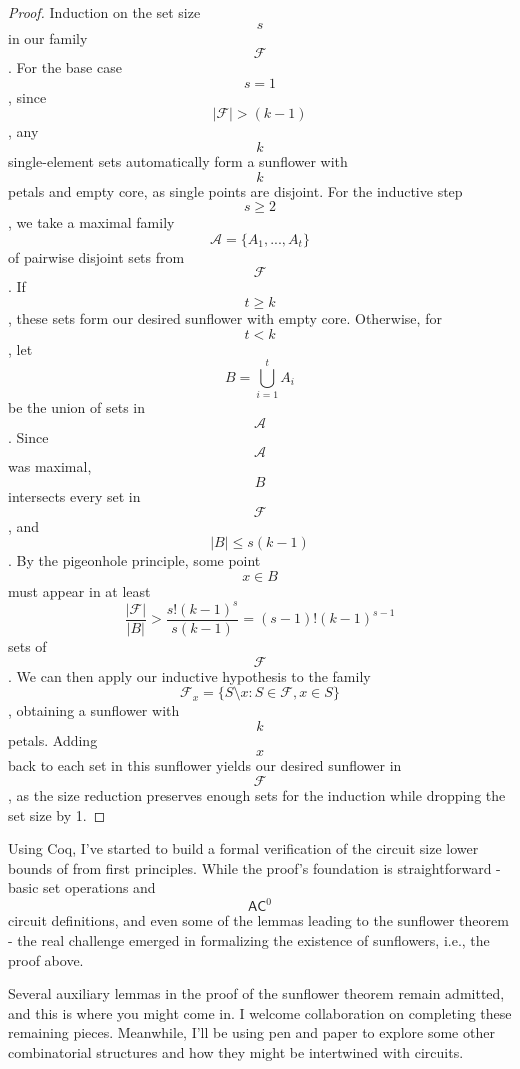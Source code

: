 \documentclass[a4, 12pt]{article}
\begin{document}
\begin{proof}
     Induction on the set size $$s$$ in our family $$\mathcal{F}$$. For the base case $$s=1$$, since $$|\mathcal{F}| > (k-1)$$, any $$k$$ single-element sets automatically form a sunflower with $$k$$ petals and empty core, as single points are disjoint. For the inductive step $$s \geq 2$$, we take a maximal family $$\mathcal{A} = \{A_1, ..., A_t\}$$ of pairwise disjoint sets from $$\mathcal{F}$$. If $$t \geq k$$, these sets form our desired sunflower with empty core. Otherwise, for $$t < k$$, let $$B = \bigcup_{i=1}^t A_i$$ be the union of sets in $$\mathcal{A}$$. Since $$\mathcal{A}$$ was maximal, $$B$$ intersects every set in $$\mathcal{F}$$, and $$|B| \leq s(k-1)$$. By the pigeonhole principle, some point $$x \in B$$ must appear in at least $$\frac{|\mathcal{F}|}{|B|} > \frac{s!(k-1)^s}{s(k-1)} = (s-1)!(k-1)^{s-1}$$ sets of $$\mathcal{F}$$. We can then apply our inductive hypothesis to the family $$\mathcal{F}_x = \{S \setminus {x} : S \in \mathcal{F}, x \in S\}$$, obtaining a sunflower with $$k$$ petals. Adding $$x$$ back to each set in this sunflower yields our desired sunflower in $$\mathcal{F}$$, as the size reduction preserves enough sets for the induction while dropping the set size by 1.
\end{proof}
Using Coq, I've started to build a formal verification of the circuit size lower bounds of \cite{Hstad1995} from first principles. While the proof's foundation is straightforward - basic set operations and $$\mathsf{AC}^0$$ circuit definitions, and even some of the lemmas leading to the sunflower theorem - the real challenge emerged in formalizing the existence of sunflowers, i.e., the proof above. 

Several auxiliary lemmas in the proof of the sunflower theorem remain admitted, and this is where you might come in. I welcome collaboration on completing these remaining pieces. Meanwhile, I'll be using pen and paper to explore some other combinatorial structures and how they might be intertwined with circuits.


\end{document}
